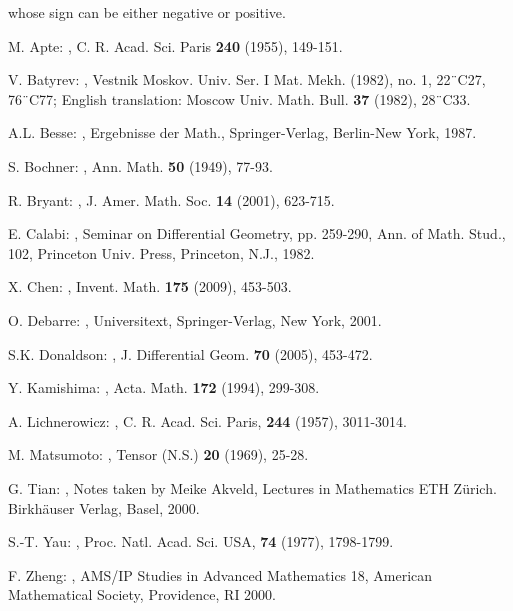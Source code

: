 \documentclass[11pt]{amsart}
\theoremstyle{definition}
\theoremstyle{remark}
\numberwithin{equation}{section}
\begin{document}
whose sign can be either negative or positive.

\begin{thebibliography}{10}
{M. Apte}:
,
\newblock  C. R. Acad. Sci. Paris {\bf 240} (1955), 149-151.

{V. Batyrev}:
,
\newblock  Vestnik Moskov. Univ. Ser. I Mat. Mekh. (1982), no. 1, 22¨C27,
76¨C77; English translation: Moscow Univ. Math. Bull. {\bf 37}
(1982), 28¨C33.

{A.L. Besse}:
,
\newblock  Ergebnisse der Math., Springer-Verlag, Berlin-New York,
1987.

{S. Bochner}:
,
\newblock  Ann. Math. {\bf 50} (1949), 77-93.

{R. Bryant}:
,
\newblock  J. Amer. Math. Soc. {\bf 14} (2001), 623-715.

{E. Calabi}:
,
\newblock Seminar on Differential Geometry, pp. 259-290,
Ann. of Math. Stud., 102, Princeton Univ. Press, Princeton, N.J.,
1982.

{X. Chen}:
,
\newblock  Invent. Math. {\bf 175} (2009), 453-503.

{O. Debarre}:
,
\newblock Universitext, Springer-Verlag, New York, 2001.

{S.K. Donaldson}:
,
\newblock  J. Differential Geom. {\bf 70} (2005), 453-472.

{Y. Kamishima}:
,
\newblock  Acta. Math. {\bf 172} (1994), 299-308.

{A. Lichnerowicz}:
,
\newblock  C. R. Acad. Sci. Paris, {\bf 244} (1957), 3011-3014.

{M. Matsumoto}:
,
\newblock  Tensor (N.S.) {\bf 20} (1969), 25-28.

{G. Tian}:
,
\newblock Notes taken by Meike Akveld, Lectures in Mathematics ETH Z\"{u}rich. Birkh\"{a}user Verlag, Basel,
2000.

{S.-T. Yau}:
,
\newblock  Proc. Natl. Acad. Sci. USA, {\bf 74} (1977), 1798-1799.

{F. Zheng}:
,
\newblock  AMS/IP Studies in Advanced Mathematics 18, American Mathematical Society, Providence, RI 2000.
\end{thebibliography}
\end{document}
